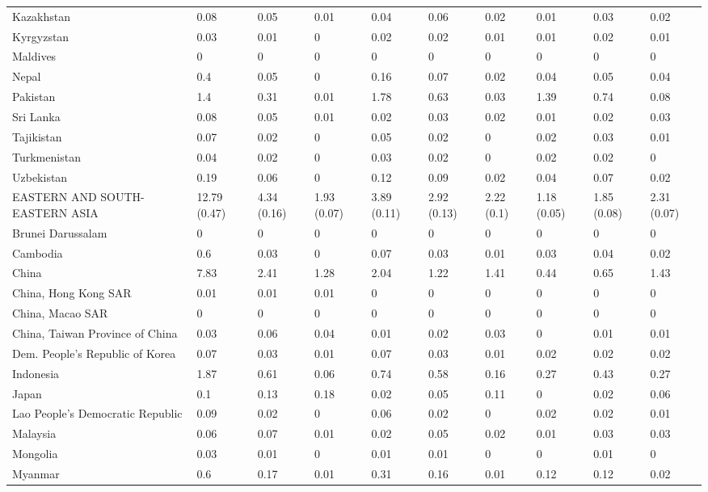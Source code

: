 \begin{longtable}[t]{llllllllll}
Kazakhstan & 0.08 & 0.05 & 0.01 & 0.04 & 0.06 & 0.02 & 0.01 & 0.03 & 0.02\\
Kyrgyzstan & 0.03 & 0.01 & 0 & 0.02 & 0.02 & 0.01 & 0.01 & 0.02 & 0.01\\
Maldives & 0 & 0 & 0 & 0 & 0 & 0 & 0 & 0 & 0\\
Nepal & 0.4 & 0.05 & 0 & 0.16 & 0.07 & 0.02 & 0.04 & 0.05 & 0.04\\
Pakistan & 1.4 & 0.31 & 0.01 & 1.78 & 0.63 & 0.03 & 1.39 & 0.74 & 0.08\\
Sri Lanka & 0.08 & 0.05 & 0.01 & 0.02 & 0.03 & 0.02 & 0.01 & 0.02 & 0.03\\
Tajikistan & 0.07 & 0.02 & 0 & 0.05 & 0.02 & 0 & 0.02 & 0.03 & 0.01\\
Turkmenistan & 0.04 & 0.02 & 0 & 0.03 & 0.02 & 0 & 0.02 & 0.02 & 0\\
Uzbekistan & 0.19 & 0.06 & 0 & 0.12 & 0.09 & 0.02 & 0.04 & 0.07 & 0.02\\
EASTERN AND SOUTH-EASTERN ASIA & 12.79 (0.47) & 4.34 (0.16) & 1.93 (0.07) & 3.89 (0.11) & 2.92 (0.13) & 2.22 (0.1) & 1.18 (0.05) & 1.85 (0.08) & 2.31 (0.07)\\
Brunei Darussalam & 0 & 0 & 0 & 0 & 0 & 0 & 0 & 0 & 0\\
Cambodia & 0.6 & 0.03 & 0 & 0.07 & 0.03 & 0.01 & 0.03 & 0.04 & 0.02\\
China & 7.83 & 2.41 & 1.28 & 2.04 & 1.22 & 1.41 & 0.44 & 0.65 & 1.43\\
China, Hong Kong SAR & 0.01 & 0.01 & 0.01 & 0 & 0 & 0 & 0 & 0 & 0\\
China, Macao SAR & 0 & 0 & 0 & 0 & 0 & 0 & 0 & 0 & 0\\
China, Taiwan Province of China & 0.03 & 0.06 & 0.04 & 0.01 & 0.02 & 0.03 & 0 & 0.01 & 0.01\\
Dem. People's Republic of Korea & 0.07 & 0.03 & 0.01 & 0.07 & 0.03 & 0.01 & 0.02 & 0.02 & 0.02\\
Indonesia & 1.87 & 0.61 & 0.06 & 0.74 & 0.58 & 0.16 & 0.27 & 0.43 & 0.27\\
Japan & 0.1 & 0.13 & 0.18 & 0.02 & 0.05 & 0.11 & 0 & 0.02 & 0.06\\
Lao People's Democratic Republic & 0.09 & 0.02 & 0 & 0.06 & 0.02 & 0 & 0.02 & 0.02 & 0.01\\
Malaysia & 0.06 & 0.07 & 0.01 & 0.02 & 0.05 & 0.02 & 0.01 & 0.03 & 0.03\\
Mongolia & 0.03 & 0.01 & 0 & 0.01 & 0.01 & 0 & 0 & 0.01 & 0\\
Myanmar & 0.6 & 0.17 & 0.01 & 0.31 & 0.16 & 0.01 & 0.12 & 0.12 & 0.02\\

\end{longtable}
